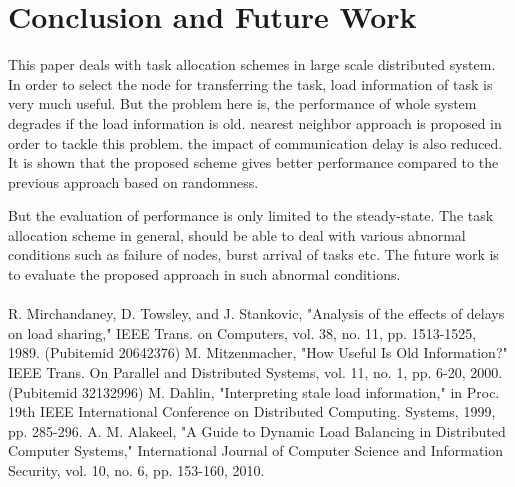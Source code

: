 \documentclass[12pt]{article}
\begin{document}
\clearpage
\section{Conclusion and Future Work}
This paper deals with task allocation schemes in large scale distributed system. In order to select the node for transferring the task, load information of task is very much useful. But the problem here is, the performance of whole system degrades if the load information is old. nearest neighbor approach is proposed in order to tackle this problem. the impact of communication delay is also reduced. It is shown that the proposed scheme gives better performance compared to the previous approach based on randomness.
\\
\par
	But the evaluation of performance is only limited to the steady-state. The task allocation scheme in general, should be able to deal with various abnormal conditions such as failure of nodes, burst arrival of tasks etc. The future work is to evaluate the proposed approach in such abnormal conditions.


\paragraph{}
 
\clearpage
\begin{thebibliography}{}
\bibitem{}
R. Mirchandaney, D. Towsley, and J. Stankovic, "Analysis of the effects of delays on load sharing," IEEE Trans. on Computers, vol. 38, no. 11, pp. 1513-1525, 1989. (Pubitemid 20642376)
\bibitem{}
M. Mitzenmacher, "How Useful Is Old Information?" IEEE Trans. On Parallel and Distributed Systems, vol. 11, no. 1, pp. 6-20, 2000. (Pubitemid 32132996)
\bibitem{}
M. Dahlin, "Interpreting stale load information," in Proc. 19th IEEE International Conference on Distributed Computing. Systems, 1999, pp. 285-296.
\bibitem{}
A. M. Alakeel, "A Guide to Dynamic Load Balancing in Distributed Computer Systems," International Journal of Computer Science and Information Security, vol. 10, no. 6, pp. 153-160, 2010.

\end{thebibliography}
\end{document}
